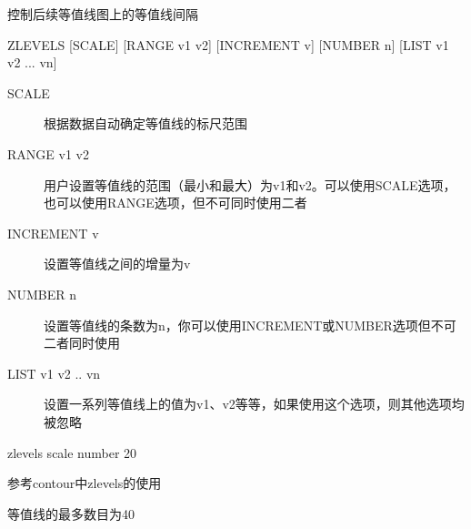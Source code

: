 \label{cmd:zlevels}

控制后续等值线图上的等值线间隔

\begin{SACSTX}
ZLEVELS [SCALE] [RANGE v1 v2] [INCREMENT v] [NUMBER n]
    [LIST v1 v2 ... vn]
\end{SACSTX}

\begin{description}
\item [SCALE] 根据数据自动确定等值线的标尺范围
\item [RANGE v1 v2] 用户设置等值线的范围（最小和最大）为v1和v2。可以使用SCALE选项，也可以使用RANGE选项，但不可同时使用二者
\item [INCREMENT v] 设置等值线之间的增量为v
\item [NUMBER n] 设置等值线的条数为n，你可以使用INCREMENT或NUMBER选项但不可二者同时使用
\item [LIST v1 v2 .. vn] 设置一系列等值线上的值为v1、v2等等，如果使用这个选项，则其他选项均被忽略
\end{description}

\begin{SACDFT}
zlevels scale number 20
\end{SACDFT}

参考contour中zlevels的使用

等值线的最多数目为40

